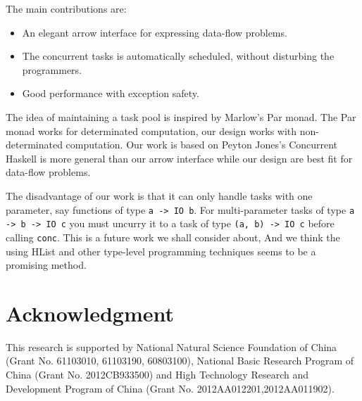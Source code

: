 \documentclass[conference]{IEEEtran}
\begin{document}
The main contributions are:
\begin{itemize}
  \item An elegant arrow interface for expressing data-flow problems.
  \item The concurrent tasks is automatically scheduled, without disturbing the programmers.
  \item Good performance with exception safety.
\end{itemize}

The idea of maintaining a task pool is inspired by Marlow's Par monad.\cite{Marlow2011a}
The Par monad works for
determinated computation, our design works with non-determinated computation.
Our work is based on Peyton Jones's Concurrent Haskell\cite{Jones1996} 
is more general than our arrow interface while our design are best fit for data-flow problems.

The disadvantage of our work is that it can only handle tasks with one parameter, say functions of
type \texttt{a -> IO b}. For multi-parameter tasks of type \texttt{a -> b -> IO c} you must uncurry
it to a task of type \texttt{(a, b) -> IO c} before calling \texttt{conc}. This is a future work
we shall consider about, And we think the using HList\cite{Kiselyov2004} and other
type-level programming techniques seems to be a promising method.



\section*{Acknowledgment}
This research is supported by National Natural Science Foundation of China
(Grant No. 61103010, 61103190, 60803100), National Basic Research Program
of China (Grant No. 2012CB933500) and High Technology Research and Development
Program of China (Grant No. 2012AA012201,2012AA011902).



%
%
%






\end{document}
